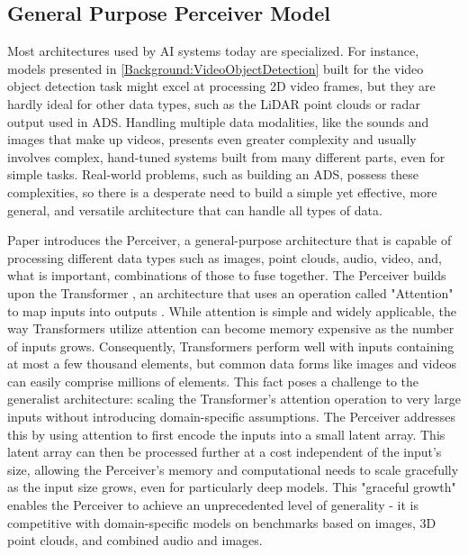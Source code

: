 \subsection{General Purpose Perceiver Model} \label{Background:Perceiver}

Most architectures used by AI systems today are specialized. For instance, models presented in \ref{Background:VideoObjectDetection} built for the video object detection task might excel at processing 2D video frames, but they are hardly ideal for other data types, such as the LiDAR point clouds or radar output used in ADS. Handling multiple data modalities, like the sounds and images that make up videos, presents even greater complexity and usually involves complex, hand-tuned systems built from many different parts, even for simple tasks. Real-world problems, such as building an ADS, possess these complexities, so there is a desperate need to build a simple yet effective, more general, and versatile architecture that can handle all types of data.

Paper \cite{jaeglePerceiverGeneralPerception2021} introduces the Perceiver, a general-purpose architecture that is capable of processing different data types such as images, point clouds, audio, video, and, what is important, combinations of those to fuse together. The Perceiver builds upon the Transformer \cite{}, an architecture that uses an operation called "Attention" to map inputs into outputs \cite{}. While attention is simple and widely applicable, the way Transformers utilize attention can become memory expensive as the number of inputs grows. Consequently, Transformers perform well with inputs containing at most a few thousand elements, but common data forms like images and videos can easily comprise millions of elements. This fact poses a challenge to the generalist architecture: scaling the Transformer's attention operation to very large inputs without introducing domain-specific assumptions. The Perceiver addresses this by using attention to first encode the inputs into a small latent array. This latent array can then be processed further at a cost independent of the input's size, allowing the Perceiver's memory and computational needs to scale gracefully as the input size grows, even for particularly deep models. This "graceful growth" enables the Perceiver to achieve an unprecedented level of generality - it is competitive with domain-specific models on benchmarks based on images, 3D point clouds, and combined audio and images.

